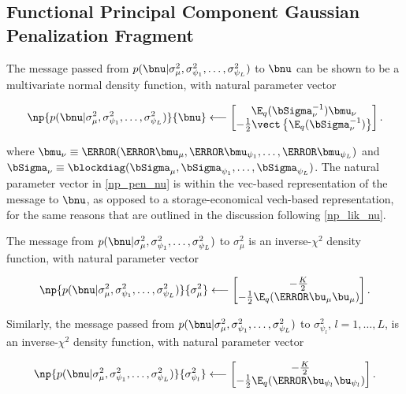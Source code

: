 \documentclass[ba]{imsart}
\numberwithin{equation}{section}
\theoremstyle{plain}
\def\Sigmanu{\bSigma_{\nu}}
\def\munu{\bmu_{\nu}}
\def\sigsqmu{\sigma^2_{\mu}}
\def\mumu{\bmu_\mu}
\def\umu{\bu_\mu}
\newcommand\upsi[1]{\bu_{\psi_{#1}}}
\newcommand\sigsqpsi[1]{\sigma^2_{\psi_{#1}}}
\newcommand\mupsi[1]{\bmu_{\psi_#1}}
\begin{document}

\subsection{Functional Principal Component Gaussian Penalization Fragment}
\label{sec:mean_fpc_gauss_pen_frag}

The message passed from $p (\bnu | \sigsqmu, \sigsqpsi{1}, \dots, \sigsqpsi{L})$ to $\bnu$ can be shown to
be a multivariate normal density function, with natural parameter vector

\begin{equation}
	\np{p (\bnu | \sigsqmu, \sigsqpsi{1}, \dots, \sigsqpsi{L})}{\bnu}
		\longleftarrow
			\begin{bmatrix}
				\E_q (\Sigmanu^{-1}) \munu \\
				-\frac12 \vect \left\{ \E_q (\Sigmanu^{-1}) \right\}
			\end{bmatrix}.
\label{np_pen_nu}
\end{equation}

\noindent where $\munu \equiv \T{(\T{\mumu}, \T{\mupsi{1}}, \dots, \T{\mupsi{L}})}$ and
$\Sigmanu \equiv \blockdiag (\bSigma_\mu, \bSigma_{\psi_1}, \dots, \bSigma_{\psi_L})$.
The natural parameter vector in \eqref{np_pen_nu} is within the
vec-based representation of the message to $\bnu$, as opposed to
a storage-economical vech-based representation, for the same reasons that are outlined in the discussion
following \eqref{np_lik_nu}.

The message from $p (\bnu | \sigsqmu, \sigsqpsi{1}, \dots, \sigsqpsi{L})$ to $\sigsqmu$ is an inverse-$\chi^2$
density function, with natural parameter vector

\begin{equation}
	\np{p (\bnu | \sigsqmu, \sigsqpsi{1}, \dots, \sigsqpsi{L})}{\sigsqmu}
		\longleftarrow
			\begin{bmatrix}
				-\frac{K}{2} \\
				-\frac12 \E_q (\T{\umu} \umu)
			\end{bmatrix}.
\label{np_pen_sigsqmu}
\end{equation}

Similarly, the message passed from $p (\bnu | \sigsqmu, \sigsqpsi{1}, \dots, \sigsqpsi{L})$ to $\sigsqpsi{l}$,
$l = 1, \dots, L$, is an inverse-$\chi^2$ density function, with natural parameter vector

\begin{equation}
	\np{p (\bnu | \sigsqmu, \sigsqpsi{1}, \dots, \sigsqpsi{L})}{\sigsqpsi{l}}
		\longleftarrow
			\begin{bmatrix}
				-\frac{K}{2} \\
				-\frac12 \E_q (\T{\upsi{l}} \upsi{l})
			\end{bmatrix}.
\label{np_pen_sigsqpsi}
\end{equation}
\end{document}
